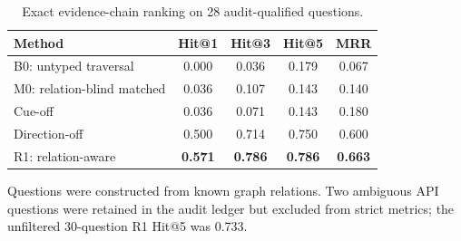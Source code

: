 \begin{table}[!ht]
\centering
\begin{threeparttable}
\caption{Exact evidence-chain ranking on 28 audit-qualified questions.}
\label{tab:graphchain}
\small
\begin{tabular}{lcccc}
\toprule
Method & Hit@1 & Hit@3 & Hit@5 & MRR \\
\midrule
B0: untyped traversal & 0.000 & 0.036 & 0.179 & 0.067 \\
M0: relation-blind matched & 0.036 & 0.107 & 0.143 & 0.140 \\
Cue-off & 0.036 & 0.071 & 0.143 & 0.180 \\
Direction-off & 0.500 & 0.714 & 0.750 & 0.600 \\
R1: relation-aware & \textbf{0.571} & \textbf{0.786} & \textbf{0.786} & \textbf{0.663} \\
\bottomrule
\end{tabular}
\begin{tablenotes}[flushleft]\footnotesize
\item Questions were constructed from known graph relations. Two ambiguous API questions were retained in the audit ledger but excluded from strict metrics; the unfiltered 30-question R1 Hit@5 was 0.733.
\end{tablenotes}
\end{threeparttable}
\end{table}
